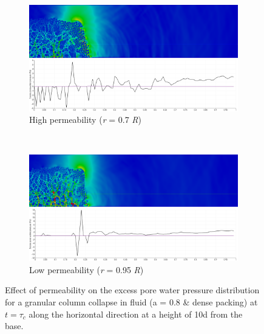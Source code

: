 \begin{figure}
\centering
\begin{subfigure}[t]{0.975\textwidth}
	\centering
    \includegraphics[width=\textwidth]{a08/r07_PWP_ini_dense}
    \caption{High permeability (\textit{r} = 0.7 \textit{R})}
    \label{fig:r07_PWP_ini_dense}
\end{subfigure} \\
\begin{subfigure}[t]{0.975\textwidth}
	\centering
    \includegraphics[width=\textwidth]{a08/r095_PWP_ini_dense}
    \caption{Low permeability (\textit{r} = 0.95 \textit{R})}
    \label{fig:r095_PWP_ini_dense}
\end{subfigure}
\caption{Effect of permeability on the excess pore water pressure distribution 
for a granular column collapse in fluid (a = 0.8 \& dense packing) at $t = 
\tau_c$ along the horizontal direction at a height of 10d from the base.}
\label{fig:PWP_ini_dense}
\end{figure}

